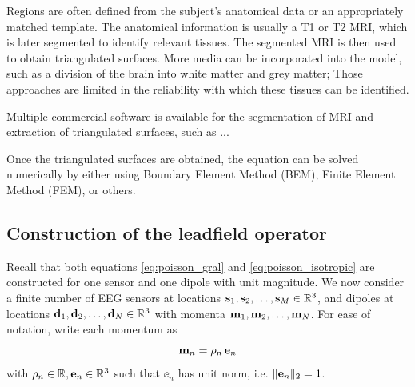 Regions are often defined from the subject's anatomical data or an appropriately matched template.
%
The anatomical information is usually a T1 or T2 MRI, which is later segmented to identify relevant tissues. The segmented MRI is then used to obtain triangulated surfaces. 
%
More media can be incorporated into the model, such as a division of the brain into white matter and grey matter;
Those approaches are limited in the reliability with which these tissues can be identified.

Multiple commercial software is available for the segmentation of MRI and extraction of triangulated surfaces, such as ...

Once the triangulated surfaces are obtained, the equation can be solved numerically by either using Boundary Element Method (BEM), Finite Element Method (FEM), or others.

\subsection{Construction of the leadfield operator}

Recall that both equations \eqref{eq:poisson_gral} and \eqref{eq:poisson_isotropic} are constructed for one sensor and one dipole with unit magnitude.
%
We now consider a finite number of EEG sensors at locations $\mathbf{s}_1, \mathbf{s}_2, \dots, \mathbf{s}_M \in \mathbb{R}^3$, and dipoles at locations $\mathbf{d}_1, \mathbf{d}_2, \dots, \mathbf{d}_N \in \mathbb{R}^3$
with momenta $\mathbf{m}_1, \mathbf{m}_2, \dots, \mathbf{m}_N$.
%
For ease of notation, write each momentum as
\begin{equation}
    \mathbf{m}_n = \rho_n\, \mathbf{e}_n
\end{equation}
with $\rho_n\in \mathbb{R}, \mathbf{e}_n\in \mathbb{R}^3$ such that $\ee_n$ has unit norm, i.e. $\lVert \mathbf{e}_n \rVert_2 = 1$.

